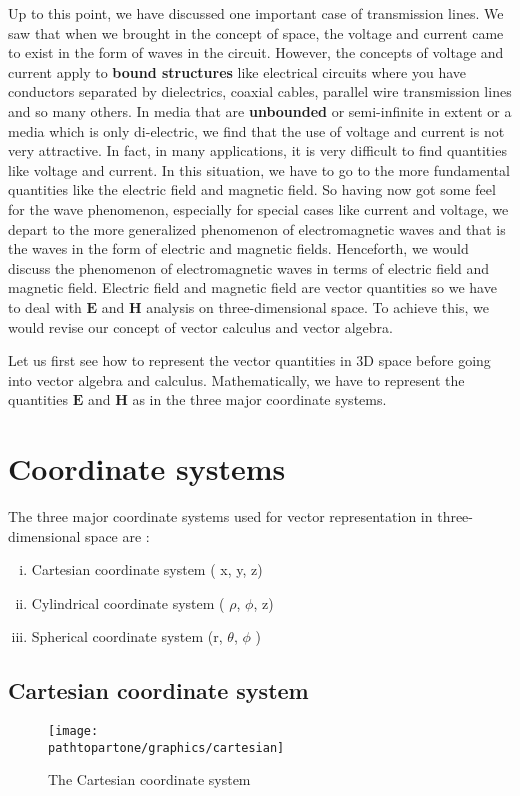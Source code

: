 Up to this point, we have discussed one important case of transmission lines. We saw that when we brought in the concept of space, the voltage and current came to exist in the form of waves in the circuit. However, the concepts of voltage and current apply to \textbf{bound structures} like electrical circuits where you have conductors separated by dielectrics, coaxial cables, parallel wire transmission lines and so many others. In media that are \textbf{unbounded} or semi-infinite in extent or a media which is only di-electric, we find that the use of voltage and current is not very attractive. In fact, in many applications, it is very difficult to find quantities like voltage and current. In this situation, we have to go to the more fundamental quantities like the electric field and magnetic field. So having now got some feel for the wave phenomenon, especially for special cases like current and voltage, we depart to the more generalized phenomenon of electromagnetic waves and that is the waves in the form of electric and magnetic fields. Henceforth, we would discuss the phenomenon of electromagnetic waves in terms of electric field and magnetic field. Electric field and magnetic field are vector quantities so we have to deal with $\boldsymbol{E}$ and $\boldsymbol{H}$ analysis on three-dimensional space. To achieve this, we would revise our concept of vector calculus and vector algebra.

Let us first see how to represent the vector quantities in 3D space before going into vector algebra and calculus. Mathematically, we have to represent the quantities $\boldsymbol{E}$ and $\boldsymbol{H}$ as  in the three major coordinate systems.

\section{Coordinate systems}
The three major coordinate systems  used for vector representation in three-dimensional space are :
\begin{enumerate}[(i)]
\item Cartesian coordinate system ( x, y, z)
\item Cylindrical coordinate system ( $\rho$, $\phi$, z)
\item Spherical coordinate system (r,  $\theta$, $\phi$ )
\end{enumerate}

\subsection{Cartesian coordinate system}
\begin{figure}[h]
\centering
\texttt{[image: \\pathtopartone/graphics/cartesian]}
\caption{The Cartesian  coordinate system}
\end{figure}

